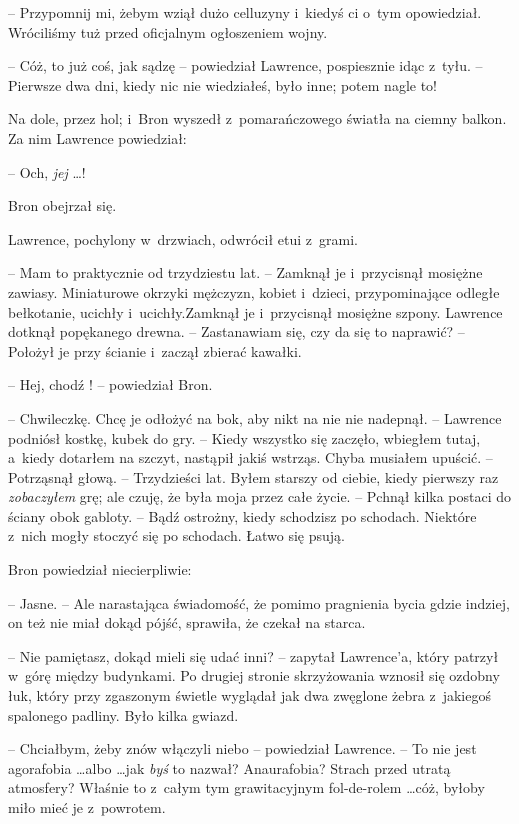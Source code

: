 \documentclass[oneside,polish,11pt,rmheadings]{mwbk}
\begin{document}
-- Przypomnij mi, żebym wziął dużo celluzyny i~kiedyś ci o~tym opowiedział. Wróciliśmy tuż przed oficjalnym ogłoszeniem wojny. 

-- Cóż, to już coś, jak sądzę -- powiedział Lawrence, pospiesznie idąc z~tyłu. -- Pierwsze dwa dni, kiedy nic nie wiedziałeś, było inne; potem nagle to! 

Na dole, przez hol; i~Bron wyszedł z~pomarańczowego światła na ciemny balkon. Za nim Lawrence powiedział:  

-- Och, \textit{jej} \ldots ! 

Bron obejrzał się. 

Lawrence, pochylony w~drzwiach, odwrócił etui z~grami. 

-- Mam to praktycznie od trzydziestu lat. -- Zamknął je i~przycisnął mosiężne zawiasy. Miniaturowe okrzyki mężczyzn, kobiet i~dzieci, przypominające odległe bełkotanie, ucichły i~ucichły.Zamknął je i~przycisnął mosiężne szpony. Lawrence dotknął popękanego drewna.  -- Zastanawiam się, czy da się to naprawić? -- Położył je przy ścianie i~zaczął zbierać kawałki. 

-- Hej, chodź ! -- powiedział Bron. 

-- Chwileczkę. Chcę je odłożyć na bok, aby nikt na nie nie nadepnął. -- Lawrence podniósł kostkę, kubek do gry. -- Kiedy wszystko się zaczęło, wbiegłem tutaj, a~kiedy dotarłem na szczyt, nastąpił jakiś wstrząs. Chyba musiałem upuścić. -- Potrząsnął głową. -- Trzydzieści lat. Byłem starszy od ciebie, kiedy pierwszy raz \textit{zobaczyłem } grę; ale czuję, że była moja przez całe życie. -- Pchnął kilka postaci do ściany obok gabloty. -- Bądź ostrożny, kiedy schodzisz po schodach. Niektóre z~nich mogły stoczyć się po schodach. Łatwo się psują. 

Bron powiedział niecierpliwie: 

-- Jasne. --  Ale narastająca świadomość, że pomimo pragnienia bycia gdzie indziej, on też nie miał dokąd pójść, sprawiła, że czekał na starca. 

-- Nie pamiętasz, dokąd mieli się udać inni? -- zapytał Lawrence'a, który patrzył w~górę między budynkami. Po drugiej stronie skrzyżowania wznosił się ozdobny łuk, który przy zgaszonym świetle wyglądał jak dwa zwęglone żebra z~jakiegoś spalonego padliny. Było kilka gwiazd. 

-- Chciałbym, żeby znów włączyli niebo -- powiedział Lawrence. -- To nie jest agorafobia \ldots  albo \ldots  jak \textit{byś }to nazwał? Anaurafobia? Strach przed utratą atmosfery? Właśnie to z~całym tym grawitacyjnym fol-de-rolem \ldots  cóż, byłoby miło mieć je z~powrotem. 
\end{document}
